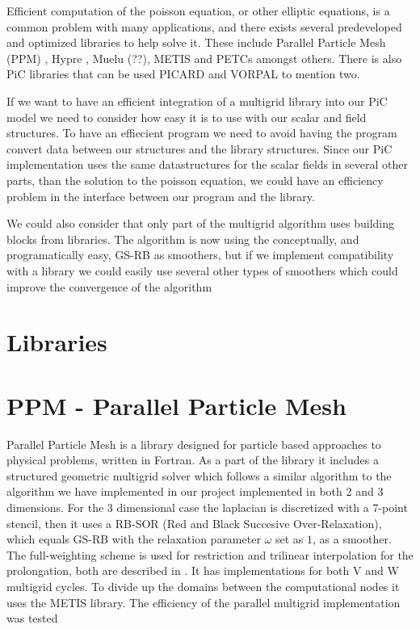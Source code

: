 

Efficient computation of the poisson equation, or other elliptic equations, is a common problem with many applications, and there exists several predeveloped and optimized libraries to help solve it. These include Parallel Particle Mesh (PPM) \citep{Sbalzarini2006}, Hypre \citep{Falgout02hypre:a}, Muelu (??), METIS \citep{METIS} and PETCs \citep{Gropp2001} amongst others. There is also PiC libraries that can be used PICARD and VORPAL to mention two.

If we want to have an efficient integration of a multigrid library into our PiC model we need to consider how easy it is to use with our scalar and field structures. To have an effiecient program we need to avoid having the program convert data between our structures and the library structures. Since our PiC implementation uses the same datastructures for the scalar fields in several other parts, than the solution to the poisson equation, we could have an efficiency problem in the interface between our program and the library.

We could also consider that only part of the multigrid algorithm uses building blocks from libraries. The algorithm is now using the conceptually, and programatically easy, GS-RB as smoothers, but if we implement compatibility with a library we could easily use several other types of smoothers which could improve the convergence of the algorithm

\section{Libraries}

\section{PPM - Parallel Particle Mesh}
Parallel Particle Mesh is a library designed for particle based approaches to physical problems, written in Fortran. As a part of the library it includes a structured geometric multigrid solver which follows a similar algorithm to the algorithm we have implemented in our project implemented in both 2 and 3 dimensions. For the 3 dimensional case the laplacian is discretized with a \(7\)-point stencil, then it uses a RB-SOR (Red and Black Succesive Over-Relaxation), which equals GS-RB with the relaxation parameter \(\omega\) set as \(1\), as a smoother. The full-weighting scheme is used for restriction and trilinear interpolation for the prolongation, both are described in \citep{Trottenberg}. It has implementations for both V and W multigrid cycles. To divide up the domains between the computational nodes it uses the METIS library. The efficiency of the parallel multigrid implementation was tested  

